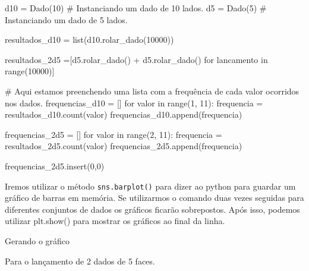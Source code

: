\documentclass[
  letterpaper,
  DIV=11,
  numbers=noendperiod]{scrreprt}
\newenvironment{Shaded}{\begin{snugshade}}{\end{snugshade}}
\newcommand{\BuiltInTok}[1]{\textcolor[rgb]{0.00,0.23,0.31}{#1}}
\newcommand{\CommentTok}[1]{\textcolor[rgb]{0.37,0.37,0.37}{#1}}
\newcommand{\ControlFlowTok}[1]{\textcolor[rgb]{0.00,0.23,0.31}{#1}}
\newcommand{\DecValTok}[1]{\textcolor[rgb]{0.68,0.00,0.00}{#1}}
\newcommand{\KeywordTok}[1]{\textcolor[rgb]{0.00,0.23,0.31}{#1}}
\newcommand{\NormalTok}[1]{\textcolor[rgb]{0.00,0.23,0.31}{#1}}
\newcommand{\OperatorTok}[1]{\textcolor[rgb]{0.37,0.37,0.37}{#1}}
\begin{document}
\begin{Shaded}
\begin{Highlighting}[]
\NormalTok{d10 }\OperatorTok{=}\NormalTok{ Dado(}\DecValTok{10}\NormalTok{)                                  }\CommentTok{\# Instanciando um dado de 10 lados.}
\NormalTok{d5 }\OperatorTok{=}\NormalTok{ Dado(}\DecValTok{5}\NormalTok{)                                    }\CommentTok{\# Instanciando um dado de 5 lados.}

\NormalTok{resultados\_d10 }\OperatorTok{=} \BuiltInTok{list}\NormalTok{(d10.rolar\_dado(}\DecValTok{10000}\NormalTok{))}
    

\NormalTok{resultados\_2d5 }\OperatorTok{=}\NormalTok{[d5.rolar\_dado() }\OperatorTok{+}\NormalTok{ d5.rolar\_dado() }\ControlFlowTok{for}\NormalTok{ lancamento }\KeywordTok{in} \BuiltInTok{range}\NormalTok{(}\DecValTok{10000}\NormalTok{)]}


\CommentTok{\# Aqui estamos preenchendo uma lista com a frequência de cada valor ocorridos nos dados.}
\NormalTok{frequencias\_d10 }\OperatorTok{=}\NormalTok{ []}
\ControlFlowTok{for}\NormalTok{ valor }\KeywordTok{in} \BuiltInTok{range}\NormalTok{(}\DecValTok{1}\NormalTok{, }\DecValTok{11}\NormalTok{):}
\NormalTok{    frequencia }\OperatorTok{=}\NormalTok{ resultados\_d10.count(valor)}
\NormalTok{    frequencias\_d10.append(frequencia)}

\NormalTok{frequencias\_2d5 }\OperatorTok{=}\NormalTok{ []}
\ControlFlowTok{for}\NormalTok{ valor }\KeywordTok{in} \BuiltInTok{range}\NormalTok{(}\DecValTok{2}\NormalTok{, }\DecValTok{11}\NormalTok{):}
\NormalTok{    frequencia }\OperatorTok{=}\NormalTok{ resultados\_2d5.count(valor)}
\NormalTok{    frequencias\_2d5.append(frequencia)}
    
\NormalTok{frequencias\_2d5.insert(}\DecValTok{0}\NormalTok{,}\DecValTok{0}\NormalTok{)}
\end{Highlighting}
\end{Shaded}

Iremos utilizar o método \texttt{sns.barplot()} para dizer ao python
para guardar um gráfico de barras em memória. Se utilizarmos o comando
duas vezes seguidas para diferentes conjuntos de dados os gráficos
ficarão sobrepostos. Após isso, podemos utilizar plt.show() para mostrar
os gráficos ao final da linha.

Gerando o gráfico

Para o lançamento de 2 dados de 5 faces.
\end{document}
